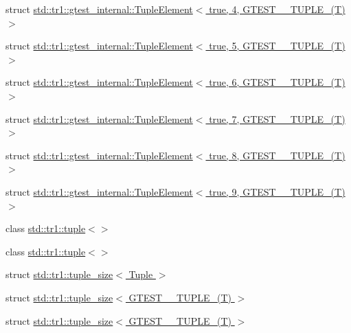 \begin{DoxyCompactItemize}
\item 
struct \hyperlink{structstd_1_1tr1_1_1gtest__internal_1_1TupleElement_3_01true_00_014_00_01GTEST__10__TUPLE___07T_08_01_4}{std\+::tr1\+::gtest\+\_\+internal\+::\+Tuple\+Element$<$ true, 4, G\+T\+E\+S\+T\+\_\+\_\+\+T\+U\+P\+L\+E\+\_\+(\+T) $>$}
\item 
struct \hyperlink{structstd_1_1tr1_1_1gtest__internal_1_1TupleElement_3_01true_00_015_00_01GTEST__10__TUPLE___07T_08_01_4}{std\+::tr1\+::gtest\+\_\+internal\+::\+Tuple\+Element$<$ true, 5, G\+T\+E\+S\+T\+\_\+\_\+\+T\+U\+P\+L\+E\+\_\+(\+T) $>$}
\item 
struct \hyperlink{structstd_1_1tr1_1_1gtest__internal_1_1TupleElement_3_01true_00_016_00_01GTEST__10__TUPLE___07T_08_01_4}{std\+::tr1\+::gtest\+\_\+internal\+::\+Tuple\+Element$<$ true, 6, G\+T\+E\+S\+T\+\_\+\_\+\+T\+U\+P\+L\+E\+\_\+(\+T) $>$}
\item 
struct \hyperlink{structstd_1_1tr1_1_1gtest__internal_1_1TupleElement_3_01true_00_017_00_01GTEST__10__TUPLE___07T_08_01_4}{std\+::tr1\+::gtest\+\_\+internal\+::\+Tuple\+Element$<$ true, 7, G\+T\+E\+S\+T\+\_\+\_\+\+T\+U\+P\+L\+E\+\_\+(\+T) $>$}
\item 
struct \hyperlink{structstd_1_1tr1_1_1gtest__internal_1_1TupleElement_3_01true_00_018_00_01GTEST__10__TUPLE___07T_08_01_4}{std\+::tr1\+::gtest\+\_\+internal\+::\+Tuple\+Element$<$ true, 8, G\+T\+E\+S\+T\+\_\+\_\+\+T\+U\+P\+L\+E\+\_\+(\+T) $>$}
\item 
struct \hyperlink{structstd_1_1tr1_1_1gtest__internal_1_1TupleElement_3_01true_00_019_00_01GTEST__10__TUPLE___07T_08_01_4}{std\+::tr1\+::gtest\+\_\+internal\+::\+Tuple\+Element$<$ true, 9, G\+T\+E\+S\+T\+\_\+\_\+\+T\+U\+P\+L\+E\+\_\+(\+T) $>$}
\item 
class \hyperlink{classstd_1_1tr1_1_1tuple_3_4}{std\+::tr1\+::tuple$<$$>$}
\item 
class \hyperlink{classstd_1_1tr1_1_1tuple}{std\+::tr1\+::tuple$<$$>$}
\item 
struct \hyperlink{structstd_1_1tr1_1_1tuple__size}{std\+::tr1\+::tuple\+\_\+size$<$ Tuple $>$}
\item 
struct \hyperlink{structstd_1_1tr1_1_1tuple__size_3_01GTEST__0__TUPLE___07T_08_01_4}{std\+::tr1\+::tuple\+\_\+size$<$ G\+T\+E\+S\+T\+\_\+\_\+\+T\+U\+P\+L\+E\+\_\+(\+T) $>$}
\item 
struct \hyperlink{structstd_1_1tr1_1_1tuple__size_3_01GTEST__1__TUPLE___07T_08_01_4}{std\+::tr1\+::tuple\+\_\+size$<$ G\+T\+E\+S\+T\+\_\+\_\+\+T\+U\+P\+L\+E\+\_\+(\+T) $>$}
\item 

\end{DoxyCompactItemize}
